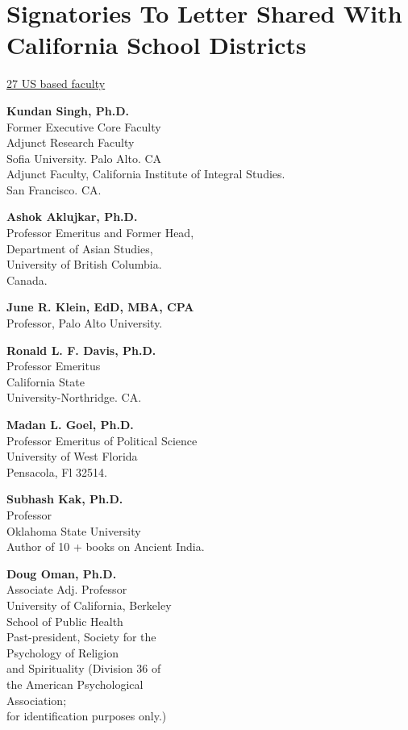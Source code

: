 \chapter{Signatories To Letter Shared With California School Districts}

\centerline{\underline{27 US based faculty}} 

\begin{multicols}{2}
\begin{trivlist}
\itemsep=10pt
\item \textbf{Kundan Singh, Ph.D.}\\ 
Former Executive Core Faculty\\
Adjunct Research Faculty\\
Sofia University. Palo Alto. CA\\
Adjunct Faculty, California Institute of Integral Studies.\\ 
San Francisco. CA. 

\item \textbf{Ashok Aklujkar, Ph.D.}\\ 
Professor Emeritus and Former Head,\\ 
Department of Asian Studies,\\ 
University of British Columbia.\\ 
Canada.

\item \textbf{June R. Klein, EdD, MBA, CPA}\\ 
Professor, Palo Alto University.


\item \textbf{Ronald L. F. Davis, Ph.D.}\\ 
Professor Emeritus\\ 
California State\\ 
University-Northridge. CA.

\item \textbf{Madan L. Goel, Ph.D.}\\ 
Professor Emeritus of Political Science\\
University of West Florida\\
Pensacola, Fl 32514.

\item \textbf{Subhash Kak, Ph.D.}\\ 
Professor\\
Oklahoma State University\\
Author of 10 + books on Ancient India.\\

\item \textbf{Doug Oman, Ph.D.}\\
Associate Adj. Professor\\
University of California, Berkeley\\
School of Public Health\\
Past-president, Society for the\\ Psychology of Religion\\ 
and Spirituality (Division 36 of\\ 
the American Psychological\\ 
Association;\\  
for identification purposes only.) 
 

\end{trivlist}
\end{multicols}
